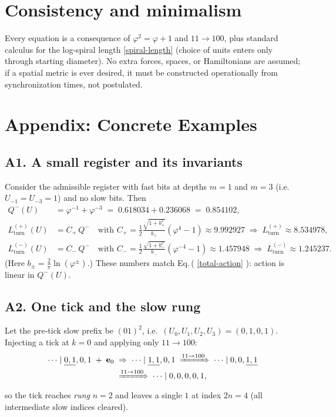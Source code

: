\documentclass[11pt]{article}
\theoremstyle{remark}
\begin{document}
\section*{Consistency and minimalism}
Every equation is a consequence of $\varphi^2=\varphi+1$ and $11\to100$, plus standard calculus for the log-spiral length \eqref{spiral-length} (choice of units enters only through starting diameter).
No extra forces, spaces, or Hamiltonians are assumed; if a spatial metric is ever desired, it must be constructed operationally from synchronization times, not postulated.


\appendix
\section*{Appendix: Concrete Examples}

\subsection*{A1. A small register and its invariants}
Consider the admissible register with fast bits at depths $m=1$ and $m=3$ (i.e.\ $U_{-1}=U_{-3}=1$) and no slow bits. Then
\begin{align*}
Q^-(U) &= \varphi^{-1}+\varphi^{-3} \;=\; 0.618034+0.236068 \;=\; 0.854102,\\
L_{\text{turn}}^{(+)}(U) &= C_+\,Q^- \quad\text{with } C_+=\tfrac12\frac{\sqrt{1+b_+^2}}{b_+}(\varphi^4-1)
\approx 9.992927 \;\Rightarrow\; L_{\text{turn}}^{(+)}\approx 8.534978,\\
L_{\text{turn}}^{(-)}(U) &= C_-\,Q^- \quad\text{with } C_-=\tfrac12\frac{\sqrt{1+b_-^2}}{b_-}(\varphi^{-4}-1)
\approx 1.457948 \;\Rightarrow\; L_{\text{turn}}^{(-)}\approx 1.245237.
\end{align*}
(Here $b_\pm=\tfrac{2}{\pi}\ln(\varphi^\pm)$.) These numbers match Eq.\,( \ref{total-action} ): action is linear in $Q^-(U)$.

\subsection*{A2. One tick and the slow rung}
Let the pre-tick slow prefix be $(01)^2$, i.e.\ $(U_0,U_1,U_2,U_3)=(0,1,0,1)$. Injecting a tick at $k=0$ and applying only $11\!\to\!100$:
\begin{align*}
\cdots\mid \underline{0,1},0,1 \;+\; \mathbf e_0 &\;\Rightarrow\; \cdots\mid \underline{1,1},0,1 \;\xRightarrow{11\to100}\; \cdots\mid 0,0,\underline{1,1}
\\[-0.25em]&\;\xRightarrow{11\to100}\; \cdots\mid 0,0,0,0,1,
\end{align*}
so the tick reaches \emph{rung} $n=2$ and leaves a single $1$ at index $2n=4$ (all intermediate slow indices cleared).
\end{document}
